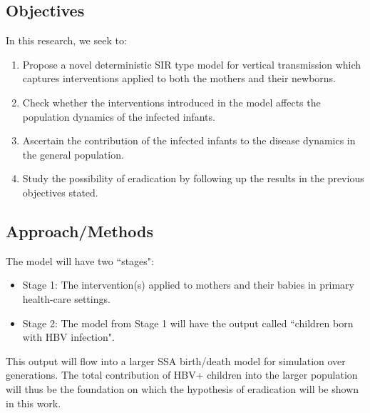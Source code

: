 \documentclass[11pt,a4paper]{article}
\begin{document}
\subsection{Objectives}
In this research, we seek to:
\begin{enumerate}
	\item Propose a novel deterministic SIR type model for vertical transmission which captures interventions applied to both the mothers and their newborns.
	\item Check whether the interventions introduced in the model affects the population dynamics of the infected infants.
	\item Ascertain the contribution of the infected infants to the disease dynamics in the general population.
	\item Study the possibility of eradication by following up the results in the previous objectives stated.
\end{enumerate}
\subsection{Approach/Methods}
The model will have two ``stages":
\begin{itemize}
	\item 	Stage 1: The intervention(s) applied to mothers and their babies in primary health-care settings. 
	\item Stage 2: The model from Stage 1 will have the output called ``children born with HBV infection". 
\end{itemize} 
This output will flow into a larger SSA birth/death model for simulation over generations.  
The total contribution of HBV+ children into the larger population will thus be the foundation
on which the hypothesis of eradication will be shown in this work.
\end{document}
